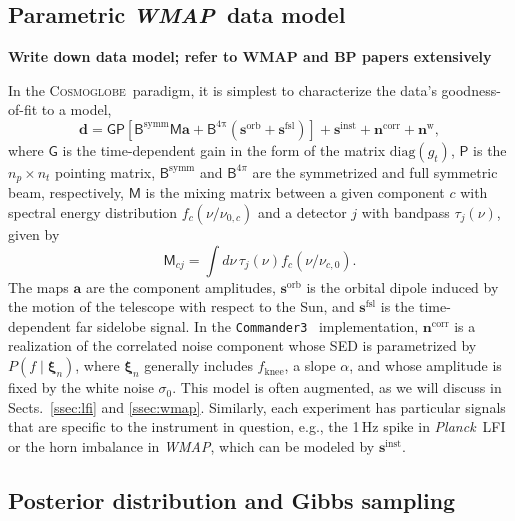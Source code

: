 \documentclass[twocolumn]{../../common/aa}
\def\WMAP{\emph{WMAP}}
\def\Planck{\emph{Planck}}
\def\commanderthree{\texttt{Commander3}}
\newcommand{\cosmoglobe}{\textsc{Cosmoglobe}}
\begin{document}
\subsection{Parametric \WMAP\ data model}

\textbf{Write down data model; refer to WMAP and BP papers extensively}

In the \cosmoglobe\ paradigm, it is simplest to characterize the data's goodness-of-fit to a model,
\begin{equation}
	\label{eq:model}
	\boldsymbol d =\mathsf G\mathsf P[\mathsf B^\mathrm{symm}\mathsf M\boldsymbol a+\mathsf B^\mathrm{4\pi}(\boldsymbol s^\mathrm{orb}
	+\boldsymbol s^\mathrm{fsl})] + \boldsymbol s^\mathrm{inst}+\boldsymbol n^\mathrm{corr}+\boldsymbol n^\mathrm w,
\end{equation}
where $\mathsf G$ is the time-dependent gain in the form of the matrix $\mathrm{diag}(g_t)$, $\mathsf P$ is the $n_p\times n_t$ pointing matrix, 
$\mathsf B^\mathrm{symm}$ and $\mathsf B^{4\pi}$ are the symmetrized and full symmetric beam, respectively, $\mathsf M$ is the mixing matrix between a given component $c$ with spectral energy distribution $f_c(\nu/\nu_{0,c})$ and a detector $j$ with bandpass $\tau_j(\nu)$, given by
\begin{equation}
	\mathsf M_{cj}=\int d\nu\,\tau_j(\nu)f_c(\nu/\nu_{c,0}).
\end{equation}
The maps $\boldsymbol a$ are the component amplitudes, $\boldsymbol s^\mathrm{orb}$ is the orbital dipole induced by the motion of the telescope with respect to the Sun, and $\boldsymbol s^\mathrm{fsl}$ is the time-dependent far sidelobe signal. In the \commanderthree\ \citep{bp03} implementation, $\boldsymbol n^\mathrm{corr}$ is a realization of the correlated noise component whose SED is parametrized by $P(f\mid\boldsymbol\xi_n)$, where $\boldsymbol\xi_n$ generally includes $f_\mathrm{knee}$, a slope $\alpha$, and whose amplitude is fixed by the white noise $\sigma_0$. This model is often augmented, as we will discuss in Sects.~\ref{ssec:lfi} and \ref{ssec:wmap}. Similarly, each experiment has particular signals that are specific to the instrument in question, e.g., the 1\,Hz spike in \Planck\ LFI or the horn imbalance in \WMAP, which can be modeled by $\boldsymbol s^\mathrm{inst}$.

\subsection{Posterior distribution and Gibbs sampling}
\end{document}
